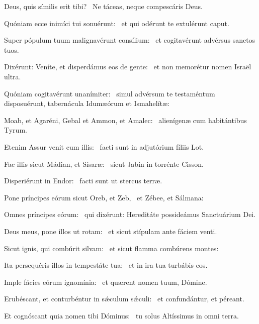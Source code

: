 \item Deus, quis símilis erit tibi?~\psstar{} Ne táceas, neque compescáris Deus.

\item Quóniam ecce inimíci tui sonuérunt:~\psstar{} et qui odérunt te extulérunt caput.

\item Super pópulum tuum malignavérunt consílium:~\psstar{} et cogitavérunt advérsus sanctos tuos.

\item Dixérunt: Veníte, et disperdámus eos de gente:~\psstar{} et non memorétur nomen Israël ultra.

\item Quóniam cogitavérunt unanímiter:~\psstar{} simul advérsum te testaméntum disposuérunt, tabernácula Idumæórum et Ismahelítæ:

\item Moab, et Agaréni, Gebal et Ammon, et Amalec:~\psstar{} alienígenæ cum habitántibus Tyrum.

\item Etenim Assur venit cum illis:~\psstar{} facti sunt in adjutórium fíliis Lot.

\item Fac illis sicut Mádian, et Sísaræ:~\psstar{} sicut Jabin in torrénte Cisson.

\item Disperiérunt in Endor:~\psstar{} facti sunt ut stercus terræ.

\item Pone príncipes eórum sicut Oreb, et Zeb,~\psstar{} et Zébee, et Sálmana:

\item Omnes príncipes eórum:~\psstar{} qui dixérunt: Hereditáte possideámus Sanctuárium Dei.

\item Deus meus, pone illos ut rotam:~\psstar{} et sicut stípulam ante fáciem venti.

\item Sicut ignis, qui combúrit silvam:~\psstar{} et sicut flamma combúrens montes:

\item Ita persequéris illos in tempestáte tua:~\psstar{} et in ira tua turbábis eos.

\item Imple fácies eórum ignomínia:~\psstar{} et quærent nomen tuum, Dómine.

\item Erubéscant, et conturbéntur in sǽculum sǽculi:~\psstar{} et confundántur, et péreant.

\item Et cognóscant quia nomen tibi Dóminus:~\psstar{} tu solus Altíssimus in omni terra.